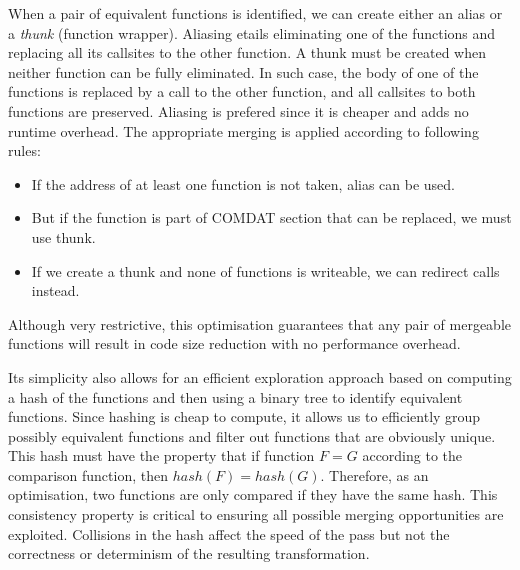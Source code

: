 When a pair of equivalent functions is identified, we can create either
an alias or a \textit{thunk} (function wrapper).
Aliasing etails eliminating one of the functions and replacing all its callsites
to the other function.
A thunk must be created when neither function can be fully eliminated.
In such case, the body of one of the functions is replaced by a call to the
other function, and all callsites to both functions are preserved.
Aliasing is prefered since it is cheaper and adds no runtime overhead.
The appropriate merging is applied according to following rules:
\begin{itemize}
\item If the address of at least one function is not taken, alias can be used.
\item But if the function is part of COMDAT section that can be replaced, we
must use thunk.
\item If we create a thunk and none of functions is writeable, we can redirect calls
instead.
\end{itemize}
Although very restrictive, this optimisation guarantees that any pair of
mergeable functions will result in code size reduction with no performance
overhead.

Its simplicity also allows for an efficient exploration approach based on computing
a hash of the functions and then using a binary tree to identify equivalent
functions.
Since hashing is cheap to compute, it allows us to efficiently
group possibly equivalent functions and filter out functions
that are obviously unique.
This hash must have the property that if function $F = G$
according to the comparison function, then $hash(F) = hash(G)$.
Therefore, as an optimisation, two functions are only compared if they have the
same hash.
This consistency property is critical to ensuring all possible merging
opportunities are exploited.
Collisions in the hash affect the speed of the pass but not the correctness
or determinism of the resulting transformation.

